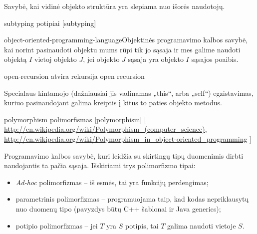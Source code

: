 \begin{glossary}
\begin{entry}
    Savybė, kai vidinė objekto struktūra yra slepiama nuo išorės
    naudotojų. \cite[225]{types-and-programming-languages}
    
  \end{entry}

  \begin{entry}%
    {subtyping}%
    {potipiai}%
    [subtyping]

    \gls{object-oriented-programming-language}{Objektinės programavimo
    kalbos} savybė, kai norint pasinaudoti objektu mums rūpi tik
    jo sąsaja ir mes galime naudoti objektą $I$ vietoj
    objekto $J$, jei objekto $J$ sąsaja yra objekto $I$ sąsajos poaibis.
    \cite[226]{types-and-programming-languages}
    
  \end{entry}

  \begin{entry}%
    {open-recursion}%
    {atvira rekursija}%
    {open recursion}

    Specialaus kintamojo (dažniausiai jis vadinamas „this“, arba
    „self“) egzistavimas, kuriuo pasinaudojant galima kreiptis į
    kitus to paties objekto metodus.
    \cite[226]{types-and-programming-languages}
    
  \end{entry}


  \begin{entry}%
    {polymorphism}%
    {polimorfismas}%
    [polymorphism]%
    [%
    \url{http://en.wikipedia.org/wiki/Polymorphism_(computer_science)}, %
    \url{http://en.wikipedia.org/wiki/Polymorphism_in_object-oriented_programming}%
    ]%

    Programavimo kalbos savybė, kuri leidžia su skirtingų tipų duomenimis
    dirbti naudojantis ta pačia sąsaja. Išskiriami trys polimorfizmo tipai:
    \begin{itemize}
      \item \emph{Ad-hoc} polimorfizmas  –
        iš esmės, tai yra funkcijų perdengimas;
      \item parametrinis polimorfizmas  –
        programuojama taip, kad kodas nepriklausytų nuo duomenų tipo
        (pavyzdys būtų C++ šablonai ir Java generics);
      \item potipio polimorfizmas  – 
        jei $T$ yra $S$ potipis, tai $T$ galima naudoti vietoje $S$.
    \end{itemize}
    
  \end{entry}
\end{glossary}

